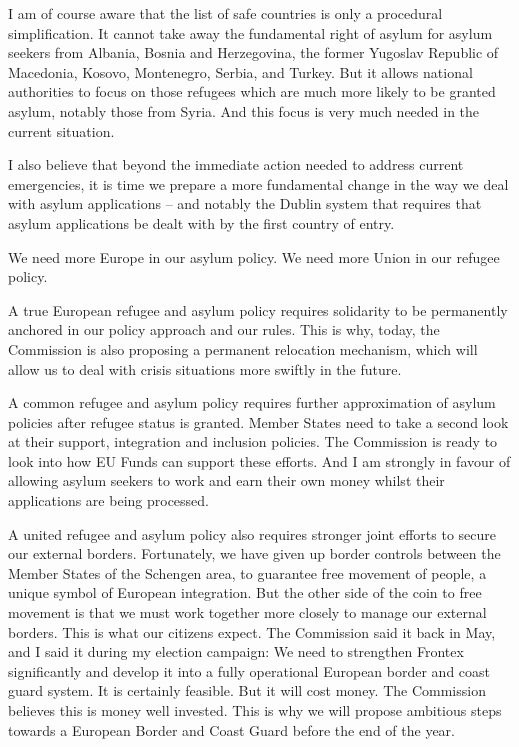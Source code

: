 \documentclass[a4paper,11pt]{article}
\begin{document}
I am of course aware that the list of safe countries is only a procedural simplification. It cannot take away the fundamental right of asylum for asylum seekers from Albania, Bosnia and Herzegovina, the former Yugoslav Republic of Macedonia, Kosovo, Montenegro, Serbia, and Turkey. But it allows national authorities to focus on those refugees which are much more likely to be granted asylum, notably those from Syria. And this focus is very much needed in the current situation.

I also believe that beyond the immediate action needed to address current emergencies, it is time we prepare a more fundamental change in the way we deal with asylum applications – and notably the Dublin system that requires that asylum applications be dealt with by the first country of entry.

We need more Europe in our asylum policy. We need more Union in our refugee policy.

A true European refugee and asylum policy requires solidarity to be permanently anchored in our policy approach and our rules. This is why, today, the Commission is also proposing a permanent relocation mechanism, which will allow us to deal with crisis situations more swiftly in the future.

A common refugee and asylum policy requires further approximation of asylum policies after refugee status is granted. Member States need to take a second look at their support, integration and inclusion policies. The Commission is ready to look into how EU Funds can support these efforts. And I am strongly in favour of allowing asylum seekers to work and earn their own money whilst their applications are being processed.

A united refugee and asylum policy also requires stronger joint efforts to secure our external borders. Fortunately, we have given up border controls between the Member States of the Schengen area, to guarantee free movement of people, a unique symbol of European integration. But the other side of the coin to free movement is that we must work together more closely to manage our external borders. This is what our citizens expect. The Commission said it back in May, and I said it during my election campaign: We need to strengthen Frontex significantly and develop it into a fully operational European border and coast guard system. It is certainly feasible. But it will cost money. The Commission believes this is money well invested. This is why we will propose ambitious steps towards a European Border and Coast Guard before the end of the year.
\end{document}
